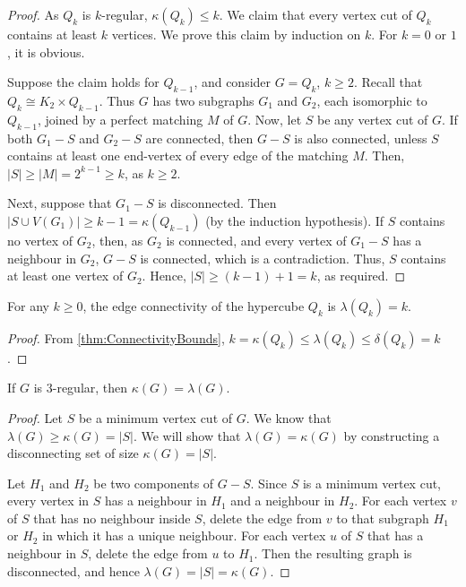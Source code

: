 \begin{proof}
As $Q_k$ is $k$-regular, $\kappa(Q_k) \le k$. We claim that every vertex cut of $Q_k$ contains at least $k$ vertices. We prove this claim by induction on $k$. For $k = 0$ or $1$, it is obvious.

Suppose the claim holds for $Q_{k - 1}$, and consider $G = Q_k$, $k \ge 2$. Recall that $Q_k \cong K_2 \times Q_{k - 1}$. Thus $G$ has two subgraphs $G_1$ and $G_2$, each isomorphic to $Q_{k - 1}$, joined by a perfect matching $M$ of $G$. Now, let $S$ be any vertex cut of $G$. If both $G_1 - S$ and $G_2 - S$ are connected, then $G - S$ is also connected, unless $S$ contains at least one end-vertex of every edge of the matching $M$. Then, $|S| \ge |M| = 2^{k - 1} \ge k$, as $k \ge 2$.

Next, suppose that $G_1 - S$ is disconnected. Then $|S \cup V(G_1)| \ge k - 1 = \kappa(Q_{k - 1})$ (by the induction hypothesis). If $S$ contains no vertex of $G_2$, then, as $G_2$ is connected, and every vertex of $G_1 - S$ has a neighbour in $G_2$, $G - S$ is connected, which is a contradiction. Thus, $S$ contains at least one vertex of $G_2$. Hence, $|S| \ge (k - 1) + 1 = k$, as required.
\end{proof}

\begin{Corollary}
For any $k \ge 0$, the edge connectivity of the hypercube $Q_k$ is $\lambda(Q_k) = k$.
\end{Corollary}

\begin{proof}
From \cref{thm:ConnectivityBounds}, $k = \kappa(Q_k) \le \lambda(Q_k) \le \delta(Q_k) = k$.
\end{proof}

\begin{Theorem}
If $G$ is $3$-regular, then $\kappa(G) = \lambda(G)$.
\end{Theorem}

\begin{proof}
Let $S$ be a minimum vertex cut of $G$. We know that $\lambda(G) \ge \kappa(G) = |S|$. We will show that $\lambda(G) = \kappa(G)$ by constructing a disconnecting set of size $\kappa(G) = |S|$.


Let $H_1$ and $H_2$ be two components of $G - S$. Since $S$ is a minimum vertex cut, every vertex in $S$ has a neighbour in $H_1$ and a neighbour in $H_2$. For each vertex $v$ of $S$ that has no neighbour inside $S$, delete the edge from $v$ to that subgraph $H_1$ or $H_2$ in which it has a unique neighbour. For each vertex $u$ of $S$ that has a neighbour in $S$, delete the edge from $u$ to $H_1$. Then the resulting graph is disconnected, and hence $\lambda(G) = |S| = \kappa(G)$.
\end{proof}


